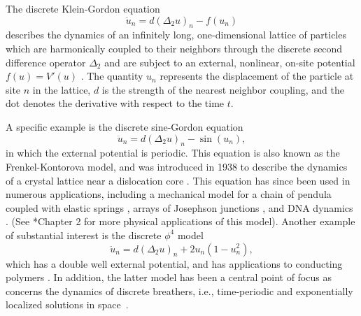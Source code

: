 \documentclass[12pt,reqno]{amsart}
\begin{document}
The discrete Klein-Gordon equation
\begin{equation*}
\ddot{u}_n = d (\Delta_2 u)_n - f(u_n)
\end{equation*}
describes the dynamics of an infinitely long, one-dimensional lattice of particles which are harmonically coupled to their neighbors through the discrete second difference operator $\Delta_2$ and are subject to an external, nonlinear, on-site potential $f(u) = V'(u)$ \cite{Karachalios}. The quantity $u_n$ represents the displacement of the particle at site $n$ in the lattice, $d$ is the strength of the nearest neighbor coupling, and the dot denotes the derivative with respect to the time $t$. 

A specific example is the discrete sine-Gordon equation
\begin{equation}\label{eq:dSG}
	\ddot{u}_n = d (\Delta_2 u)_n - \sin(u_n),
\end{equation}
in which the external potential is periodic. This equation is also known as the Frenkel-Kontorova model, and was introduced in 1938 to describe the dynamics of a crystal lattice near a dislocation core \cite{braun1998,braun2004}. This equation has since been used in numerous applications, including a mechanical model for a chain of pendula coupled with elastic springs \cite{Scott1969,english}, arrays of Josephson junctions \cites{Ustinov1992,Floria1998}, and DNA dynamics \cites{Yomosa1983,Yakushevich1998,DeLeo2011}. (See \cite{braun2004}*{Chapter 2} for more physical applications of this model). Another example of  substantial interest is the discrete $\phi^4$ model
\begin{equation}\label{eq:dphi4}
	\ddot{u}_n = d (\Delta_2 u)_n + 2 u_n(1 - u_n^2),
\end{equation}
which has a double well external potential, and has applications to conducting polymers \cite{heeger1988}. In addition, the
latter model has been a central point of focus
as concerns the dynamics of discrete 
breathers, i.e., time-periodic and exponentially localized solutions in space~\cite{tsironis,FLACH20081}.
\end{document}

